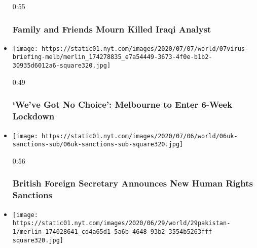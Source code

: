 \begin{itemize}
  0:55

  \hypertarget{family-and-friends-mourn-killed-iraqi-analyst}{%
  \subsubsection{Family and Friends Mourn Killed Iraqi
  Analyst}\label{family-and-friends-mourn-killed-iraqi-analyst}}
\item
  \href{https://www.nytimes.com/video/world/australia/100000007227099/melbourne-australia-lockdown.html?action=click\&module=video-series-bar\&region=header\&pgtype=Article\&playlistId=video/world}{}

  \texttt{[image: https://static01.nyt.com/images/2020/07/07/world/07virus-briefing-melb/merlin\_174278835\_e7a54449-3673-4f0e-b1b2-30935d6012a6-square320.jpg]}

  0:49

  \hypertarget{weve-got-no-choice-melbourne-to-enter-6-week-lockdown}{%
  \subsubsection{`We've Got No Choice': Melbourne to Enter 6-Week
  Lockdown}\label{weve-got-no-choice-melbourne-to-enter-6-week-lockdown}}
\item
  \href{https://www.nytimes.com/video/us/100000007226270/britain-raab-human-rights-sanctions.html?action=click\&module=video-series-bar\&region=header\&pgtype=Article\&playlistId=video/world}{}

  \texttt{[image: https://static01.nyt.com/images/2020/07/06/world/06uk-sanctions-sub/06uk-sanctions-sub-square320.jpg]}

  0:56

  \hypertarget{british-foreign-secretary-announces-new-human-rights-sanctions}{%
  \subsubsection{British Foreign Secretary Announces New Human Rights
  Sanctions}\label{british-foreign-secretary-announces-new-human-rights-sanctions}}
\item
  \href{https://www.nytimes.com/video/world/middleeast/100000007214556/pakistan-stock-exchange.html?action=click\&module=video-series-bar\&region=header\&pgtype=Article\&playlistId=video/world}{}

  \texttt{[image: https://static01.nyt.com/images/2020/06/29/world/29pakistan-1/merlin\_174028641\_cd4a65d1-5a6b-4648-93b2-3554b5263fff-square320.jpg]}


\end{itemize}
